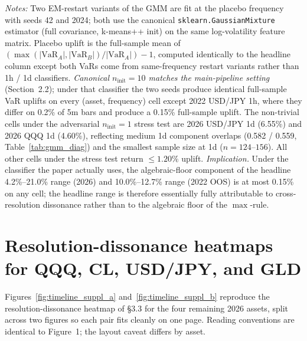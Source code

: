 \documentclass[preprint,12pt,authoryear]{elsarticle}
\begin{document}
\begin{table}[H]
{\textit{Notes:} Two EM-restart variants of the GMM are fit at the placebo frequency with seeds 42 and 2024; both use the canonical \texttt{sklearn.GaussianMixture} estimator (full covariance, k-means++ init) on the same log-volatility feature matrix. Placebo uplift is the full-sample mean of $(\max(|\text{VaR}_A|,|\text{VaR}_B|)/|\text{VaR}_A|) - 1$, computed identically to the headline column except both VaRs come from same-frequency restart variants rather than 1h / 1d classifiers. \emph{Canonical $n_{\text{init}}=10$ matches the main-pipeline setting} (Section~2.2); under that classifier the two seeds produce identical full-sample VaR uplifts on every (asset, frequency) cell except 2022 USD/JPY 1h, where they differ on 0.2\% of 5m bars and produce a 0.15\% full-sample uplift. The non-trivial cells under the adversarial $n_{\text{init}}=1$ stress test are 2026 USD/JPY 1d (6.55\%) and 2026 QQQ 1d (4.60\%), reflecting medium 1d component overlaps (0.582 / 0.559, Table~\ref{tab:gmm_diag}) and the smallest sample size at 1d ($n=124$--$156$). All other cells under the stress test return $\le 1.20\%$ uplift. \emph{Implication.} Under the classifier the paper actually uses, the algebraic-floor component of the headline 4.2\%--21.0\% range (2026) and 10.0\%--12.7\% range (2022 OOS) is at most 0.15\% on any cell; the headline range is therefore essentially fully attributable to cross-resolution dissonance rather than to the algebraic floor of the $\max$-rule.
\par}
\end{table}

\section{Resolution-dissonance heatmaps for QQQ, CL, USD/JPY, and GLD}\label{app:timeline_suppl}

Figures~\ref{fig:timeline_suppl_a} and~\ref{fig:timeline_suppl_b} reproduce the resolution-dissonance heatmap of \S{}3.3 for the four remaining 2026 assets, split across two figures so each pair fits cleanly on one page. Reading conventions are identical to Figure~1; the layout caveat differs by asset.
\end{document}
